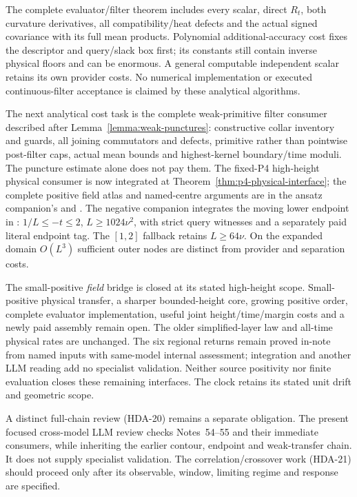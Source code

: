 The complete evaluator/filter theorem includes every scalar, direct
$R_t$, both curvature derivatives, all compatibility/heat defects and
the actual signed covariance with its full mean products. Polynomial
additional-accuracy cost fixes the descriptor and query/slack box first;
its constants still contain inverse physical floors and can be enormous.
A general computable independent scalar retains its own provider costs.
No numerical implementation or executed continuous-filter acceptance is
claimed by these analytical algorithms.

The next analytical cost task is the complete weak-primitive filter
consumer described after Lemma~\ref{lemma:weak-punctures}: constructive
collar inventory and guards, all joining commutators and defects,
primitive rather than pointwise post-filter caps, actual mean bounds and
highest-kernel boundary/time moduli. The puncture estimate alone does
not pay them. The fixed-P4 high-height physical consumer is now integrated
at Theorem~\ref{thm:p4-physical-interface}; the complete positive field
atlas and named-centre arguments are in the ansatz companion's
and .
The negative companion integrates the moving lower endpoint in
:
$1/L\le-t\le2$, $L\ge1024\nu^2$, with strict query witnesses and a
separately paid literal endpoint tag. The $[1,2]$ fallback retains
$L\ge64\nu$. On the expanded domain $O(L^3)$ sufficient outer nodes
are distinct from provider and separation costs.

The small-positive \emph{field} bridge is closed at its stated high-height
scope. Small-positive physical transfer, a sharper bounded-height core,
growing positive order, complete evaluator implementation, useful joint
height/time/margin costs and a newly paid assembly remain open. The older
simplified-layer law and all-time physical rates are unchanged. The six
regional returns remain proved in-note from named inputs with same-model
internal assessment; integration and another LLM reading add no specialist
validation. Neither source positivity nor finite evaluation closes these
remaining interfaces. The clock retains
its stated unit drift and geometric scope.

A distinct full-chain review (HDA-20) remains a separate obligation.
The present focused cross-model LLM review checks Notes~54--55 and their
immediate consumers, while inheriting the earlier contour, endpoint and
weak-transfer chain. It does not supply specialist validation. The
correlation/crossover work (HDA-21) should proceed only after its
observable, window, limiting regime and response are specified.


